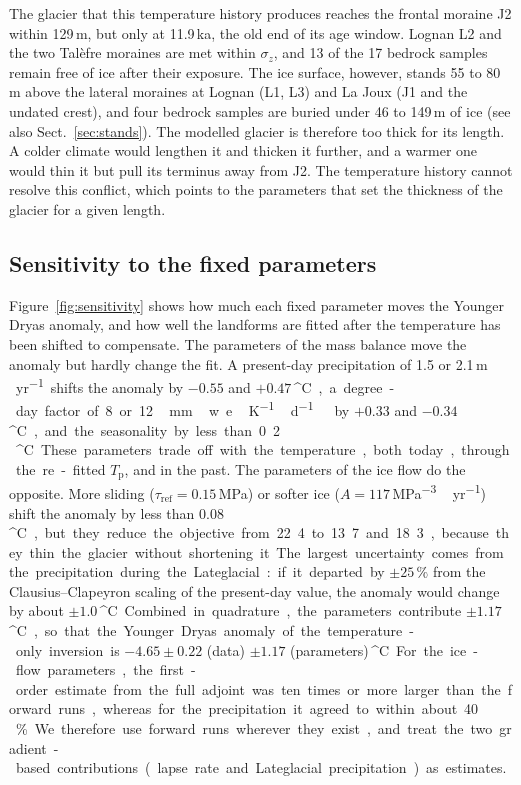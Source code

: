 \documentclass[tc, manuscript]{copernicus}
\newcommand{\degC}{\unit{^{\circ}C}}
\newcommand{\myr}{\unit{m\,yr^{-1}}}
\newcommand{\ddfunit}{\unit{mm\,w.e.\,K^{-1}\,d^{-1}}}
\newcommand{\Aunit}{\unit{MPa^{-3}\,yr^{-1}}}
\newcommand{\taur}{\tau_\mathrm{ref}}
\begin{document}
The glacier that this temperature history produces reaches the frontal moraine J2 within 129\,m, but only at 11.9\,ka, the old end of its age window. Lognan L2 and the two Tal\`efre moraines are met within $\sigma_z$, and 13 of the 17 bedrock samples remain free of ice after their exposure. The ice surface, however, stands 55 to 80\,m above the lateral moraines at Lognan (L1, L3) and La Joux (J1 and the undated crest), and four bedrock samples are buried under 46 to 149\,m of ice (see also Sect.~\ref{sec:stands}). The modelled glacier is therefore too thick for its length. A colder climate would lengthen it and thicken it further, and a warmer one would thin it but pull its terminus away from J2. The temperature history cannot resolve this conflict, which points to the parameters that set the thickness of the glacier for a given length.

\subsection{Sensitivity to the fixed parameters}
\label{sec:sensitivity}

Figure~\ref{fig:sensitivity} shows how much each fixed parameter moves the Younger Dryas anomaly, and how well the landforms are fitted after the temperature has been shifted to compensate. The parameters of the mass balance move the anomaly but hardly change the fit. A present-day precipitation of 1.5 or 2.1\,\myr\ shifts the anomaly by $-0.55$ and $+0.47$\,\degC, a degree-day factor of 8 or 12\,\ddfunit\ by $+0.33$ and $-0.34$\,\degC, and the seasonality by less than 0.2\,\degC. These parameters trade off with the temperature, both today, through the re-fitted $T_\mathrm{p}$, and in the past. The parameters of the ice flow do the opposite. More sliding ($\taur=0.15$\,MPa) or softer ice ($A=117$\,\Aunit) shift the anomaly by less than 0.08\,\degC, but they reduce the objective from 22.4 to 13.7 and 18.3, because they thin the glacier without shortening it. The largest uncertainty comes from the precipitation during the Lateglacial: if it departed by $\pm25\,\%$ from the Clausius--Clapeyron scaling of the present-day value, the anomaly would change by about $\pm1.0$\,\degC. Combined in quadrature, the parameters contribute $\pm1.17$\,\degC, so that the Younger Dryas anomaly of the temperature-only inversion is $-4.65\pm0.22$ (data) $\pm1.17$ (parameters)\,\degC.

For the ice-flow parameters, the first-order estimate from the full adjoint was ten times or more larger than the forward runs, whereas for the precipitation it agreed to within about 40\,\%. We therefore use forward runs wherever they exist, and treat the two gradient-based contributions (lapse rate and Lateglacial precipitation) as estimates.
\end{document}

